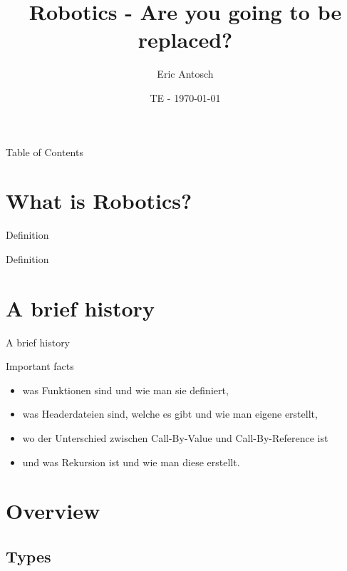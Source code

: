 \documentclass[usenames,dvipsnames,10pt]{beamer}
\title{Robotics - Are you going to be replaced?}
\date[ISPN ’80]{TE - \today}
\author{Eric Antosch}
\begin{document}
    
    \begin{frame}
        \titlepage
    \end{frame}    
    \begin{frame}{Table of Contents}
        \tableofcontents
    \end{frame}
    \section{What is Robotics?}
    \begin{frame}{Definition}
        \begin{block}{Definition}
            
        \end{block}
    \end{frame}
    \section{A brief history}
    
    \begin{frame}{A brief history}
        \begin{block}{Important facts}
            \begin{itemize}
                \item was Funktionen sind und wie man sie definiert,
                \pause
                \item was Headerdateien sind, welche es gibt und wie man eigene erstellt,
                \pause
                \item wo der Unterschied zwischen Call-By-Value und Call-By-Reference ist
                \pause
                \item und was Rekursion ist und wie man diese erstellt.
            \end{itemize}
        \end{block}
    \end{frame}

    \section{Overview}
    \subsection{Types}
\end{document}
